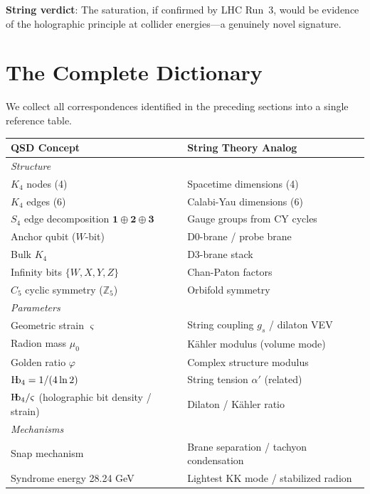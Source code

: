 \documentclass[11pt,a4paper]{article}
\theoremstyle{definition}
\newcommand{\Hb}{\textnormal{H\kern-0.3em b}}
\newcommand{\Hbfour}{\Hb_4}
\newcommand{\strain}{\varsigma}            %
\newcommand{\gr}{\varphi}
\newcommand{\murad}{\mu_0}
\newcommand{\gs}{g_s}
\newcommand{\ap}{\alpha'}
\begin{document}
\textbf{String verdict}: The saturation, if confirmed by LHC Run~3, would
be evidence of the holographic principle at collider energies---a
genuinely novel signature.


\section{The Complete Dictionary}
\label{sec:dictionary}

We collect all correspondences identified in the preceding sections into a
single reference table.

\begin{table}[h]
\centering
\small
\begin{tabular}{p{5.8cm}p{5.8cm}}
\toprule
\textbf{QSD Concept} & \textbf{String Theory Analog} \\
\midrule
\multicolumn{2}{l}{\textit{Structure}} \\
$K_4$ nodes (4) & Spacetime dimensions (4) \\
$K_4$ edges (6) & Calabi-Yau dimensions (6) \\
$S_4$ edge decomposition $\mathbf{1}\oplus\mathbf{2}\oplus\mathbf{3}$ & Gauge groups from CY cycles \\
Anchor qubit ($W$-bit) & D0-brane / probe brane \\
Bulk $K_4$ & D3-brane stack \\
Infinity bits $\{W,X,Y,Z\}$ & Chan-Paton factors \\
$C_5$ cyclic symmetry ($\mathbb{Z}_5$) & Orbifold symmetry \\
\midrule
\multicolumn{2}{l}{\textit{Parameters}} \\
Geometric strain $\strain$ & String coupling $\gs$ / dilaton VEV \\
Radion mass $\murad$ & K\"ahler modulus (volume mode) \\
Golden ratio $\gr$ & Complex structure modulus \\
$\Hbfour = 1/(4\ln 2)$ & String tension $\ap$ (related) \\
$\Hbfour/\strain$ (holographic bit density / strain) & Dilaton / K\"ahler ratio \\
\midrule
\multicolumn{2}{l}{\textit{Mechanisms}} \\
Snap mechanism & Brane separation / tachyon condensation \\
Syndrome energy 28.24 GeV & Lightest KK mode / stabilized radion \\

\end{tabular}
\end{table}
\end{document}
